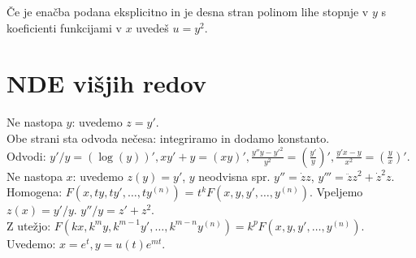 \documentclass[8pt,a4paper]{amsart}
\theoremstyle{definition} %
\theoremstyle{plain} %
\newcommand{\dx}{\ensuremath{\,\mathrm{d}x}}
\let\oldint\int
\renewcommand{\int}{\oldint \!}
\begin{document}

Če je enačba podana eksplicitno in je desna stran polinom lihe stopnje v $y$ s koeficienti funkcijami v $x$ uvedeš $u=y^2$.


\section*{\textbf{NDE višjih redov}}
Ne nastopa $y$: uvedemo $z = y'$. \\
Obe strani sta odvoda nečesa: integriramo in dodamo konstanto. \\
\hspace*{20pt} Odvodi: $y'/y = (\log(y))', x y' + y = (xy)', \frac{y'' y - y'^2}{y^2} = (\frac{y'}{y})', \frac{y' x - y}{x^2} = (\frac{y}{x})'$.\\
Ne nastopa $x$: uvedemo $z(y) = y'$, $y$ neodvisna spr. $y'' = \dot{z}z$, $y''' =
  \ddot{z}z^2 + \dot{z}^2z$. \\
Homogena: $F(x, ty, ty', \dots, ty^{(n)})$ = $t^k F(x, y, y', \dots,  y^{(n)})$. Vpeljemo $z(x) = y'/y$. $y''/y = z' + z^2$.\\
Z utežjo: $F(kx, k^my, k^{m-1}y', \dots, k^{m-n}y^{(n)}) = k^pF(x, y, y', \dots,  y^{(n)})$. Uvedemo: $x = e^t, y = u(t)e^{mt}$.
%
\end{document}

